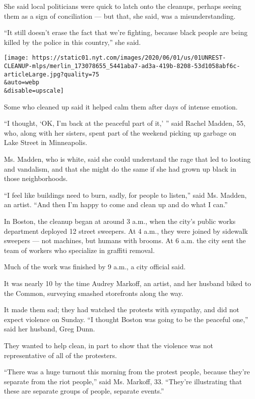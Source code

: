She said local politicians were quick to latch onto the cleanups,
perhaps seeing them as a sign of conciliation --- but that, she said,
was a misunderstanding.

``It still doesn't erase the fact that we're fighting, because black
people are being killed by the police in this country,'' she said.

\texttt{[image: https://static01.nyt.com/images/2020/06/01/us/01UNREST-CLEANUP-mlps/merlin\_173078655\_5441aba7-ad3a-419b-8208-53d1058abf6c-articleLarge.jpg?quality=75\\\&auto=webp\\\&disable=upscale]}

Some who cleaned up said it helped calm them after days of intense
emotion.

``I thought, `OK, I'm back at the peaceful part of it,' '' said Rachel
Madden, 55, who, along with her sisters, spent part of the weekend
picking up garbage on Lake Street in Minneapolis.

Ms. Madden, who is white, said she could understand the rage that led to
looting and vandalism, and that she might do the same if she had grown
up black in those neighborhoods.

``I feel like buildings need to burn, sadly, for people to listen,''
said Ms. Madden, an artist. ``And then I'm happy to come and clean up
and do what I can.''

In Boston, the cleanup began at around 3 a.m., when the city's public
works department deployed 12 street sweepers. At 4 a.m., they were
joined by sidewalk sweepers --- not machines, but humans with brooms. At
6 a.m. the city sent the team of workers who specialize in graffiti
removal.

Much of the work was finished by 9 a.m., a city official said.

It was nearly 10 by the time Audrey Markoff, an artist, and her husband
biked to the Common, surveying smashed storefronts along the way.

It made them sad; they had watched the protests with sympathy, and did
not expect violence on Sunday. ``I thought Boston was going to be the
peaceful one,'' said her husband, Greg Dunn.

They wanted to help clean, in part to show that the violence was not
representative of all of the protesters.

``There was a huge turnout this morning from the protest people, because
they're separate from the riot people,'' said Ms. Markoff, 33. ``They're
illustrating that these are separate groups of people, separate
events.''

